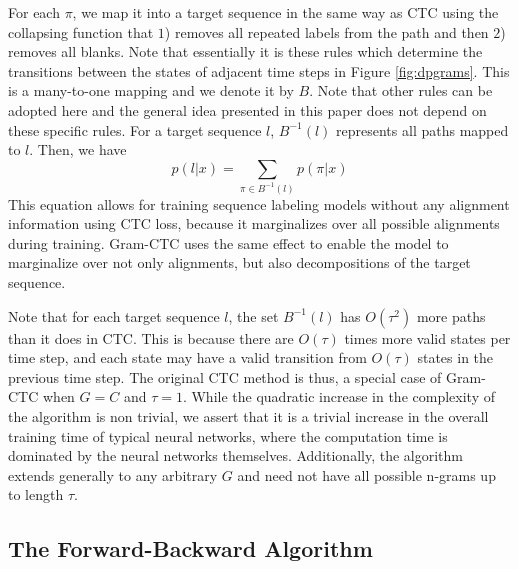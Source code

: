 \documentclass{article}
\begin{document}
For each $\pi$, we map it into a target sequence in the same way as CTC using the collapsing function that $1$) removes all repeated labels from the path and then $2$) removes all blanks. Note that essentially it is these rules which determine the transitions between the states of adjacent time steps in Figure \ref{fig:dpgrams}. This is a many-to-one mapping and we denote it by $B$. Note that other rules can be adopted here and the general idea presented in this paper does not depend on these specific rules. For a target sequence $l$, $B^{-1}(l)$ represents all paths mapped to $l$. Then, we have
\begin{equation}
p(l|x) = \sum_{\pi \in B^{-1}(l)}p(\pi|x)
\label{eqn:marginalization}
\end{equation}
This equation allows for training sequence labeling models without any alignment information using CTC loss, because it marginalizes over all possible alignments during training. Gram-CTC uses the same effect to enable the model to marginalize over not only alignments, but also decompositions of the target sequence.

Note that for each target sequence $l$, the set $B^{-1}(l)$ has $O(\tau^2)$ more paths than it does in CTC. This is because there are $O(\tau)$ times more valid states per time step, and each state may have a valid transition from $O(\tau)$ states in the previous time step. The original CTC method is thus, a special case of Gram-CTC when $G = C$ and $\tau = 1$. While the quadratic increase in the complexity of the algorithm is non trivial, we assert that it is a trivial increase in the overall training time of typical neural networks, where the computation time is dominated by the neural networks themselves. Additionally, the algorithm extends generally to any arbitrary $G$ and need not have all possible n-grams up to length $\tau$. 


\subsection{The Forward-Backward Algorithm}
\end{document}
